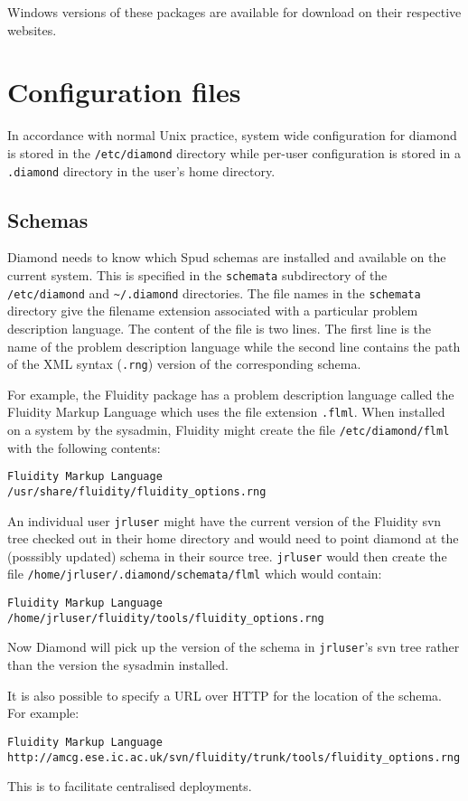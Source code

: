 \documentclass[a4paper, 11pt]{book}
\begin{document}
Windows versions of these packages are available for download on their respective websites.

\section{Configuration files}

In accordance with normal Unix practice, system wide configuration for
diamond is stored in the \verb+/etc/diamond+ directory while per-user
configuration is stored in a \verb+.diamond+ directory in the user's home
directory.

\subsection{Schemas}

Diamond needs to know which Spud schemas are installed and available on the
current system. This is specified in the \verb+schemata+ subdirectory of the
\verb+/etc/diamond+ and \verb+~/.diamond+ directories. The file names in the
\verb+schemata+ directory give the filename extension associated with a
particular problem description language. The content of the file is two
lines. The first line is the name of the problem description language while
the second line contains the path of the XML syntax (\verb+.rng+) version of
the corresponding schema.

For example, the Fluidity package has a problem description language called
the Fluidity Markup Language which uses the file extension
\verb+.flml+. When installed on a system by the sysadmin, Fluidity might
create the file \verb+/etc/diamond/flml+ with the following contents:
\begin{verbatim}
Fluidity Markup Language
/usr/share/fluidity/fluidity_options.rng
\end{verbatim}
An individual user \verb+jrluser+ might have the current version of the
Fluidity svn tree checked out in their home directory and would need to
point diamond at the (posssibly updated) schema in their source
tree. \verb+jrluser+ would then create the file
\verb+/home/jrluser/.diamond/schemata/flml+ which would contain:
\begin{verbatim}
Fluidity Markup Language
/home/jrluser/fluidity/tools/fluidity_options.rng
\end{verbatim}
Now Diamond will pick up the version of the schema in \verb+jrluser+'s svn
tree rather than the version the sysadmin installed.

It is also possible to specify a URL over HTTP for the location of the
schema. For example:
\begin{verbatim}
Fluidity Markup Language
http://amcg.ese.ic.ac.uk/svn/fluidity/trunk/tools/fluidity_options.rng
\end{verbatim}
This is to facilitate centralised deployments.
\end{document}

